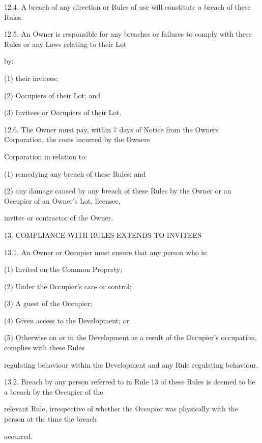 \documentclass{article}
\begin{document}
\newpage

{\fontsize{9.99}{1}12.4. A breach of any direction or Rules of use will constitute a breach of these Rules. }

{\fontsize{9.99}{1}12.5. An Owner is responsible for any breaches or failures to comply with these Rules or any Laws relating to their Lot }

{\fontsize{10.02}{1}by: }

{\fontsize{9.962}{1}(1) their invitees; }

{\fontsize{9.962}{1}(2) Occupiers of their Lot; and }

{\fontsize{9.962}{1}(3) Invitees or Occupiers of their Lot. }

{\fontsize{9.99}{1}12.6. The Owner must pay, within 7 days of Notice from the Owners Corporation, the costs incurred by the Owners }

{\fontsize{10.02}{1}Corporation in relation to: }

{\fontsize{9.962}{1}(1) remedying any breach of these Rules; and }

{\fontsize{9.962}{1}(2) any damage caused by any breach of these Rules by the Owner or an Occupier of an Owner’s Lot, licensee, }

{\fontsize{10.02}{1}invitee or contractor of the Owner. }

{\fontsize{9.99}{1}13. COMPLIANCE WITH RULES EXTENDS TO INVITEES }

{\fontsize{9.99}{1}13.1. An Owner or Occupier must ensure that any person who is: }

{\fontsize{9.962}{1}(1) Invited on the Common Property; }

{\fontsize{9.962}{1}(2) Under the Occupier’s care or control; }

{\fontsize{9.962}{1}(3) A guest of the Occupier; }

{\fontsize{9.962}{1}(4) Given access to the Development; or }

{\fontsize{9.962}{1}(5) Otherwise on or in the Development as a result of the Occupier’s occupation, complies with these Rules }

{\fontsize{10.02}{1}regulating behaviour within the Development and any Rule regulating behaviour. }

{\fontsize{9.99}{1}13.2. Breach by any person referred to in Rule 13 of these Rules is deemed to be a breach by the Occupier of the }

{\fontsize{10.02}{1}relevant Rule, irrespective of whether the Occupier was physically with the person at the time the breach }

{\fontsize{10.02}{1}occurred. }
\end{document}
